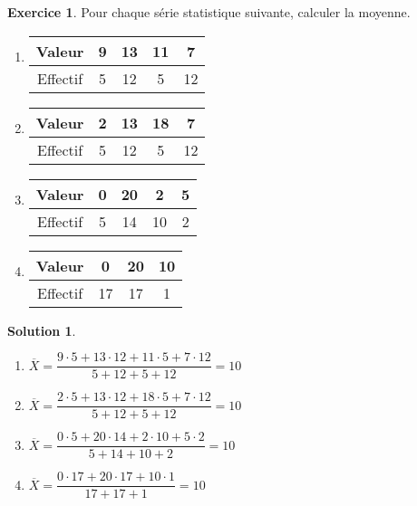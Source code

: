 \documentclass[a4paper, 14pt]{extarticle}
\theoremstyle{plain}
\newtheorem*{sol}{Solution}
\theoremstyle{definition}
\newtheorem{ex}{Exercice}
\newcommand{\exe}[2]{
		\begin{ex} #1  \end{ex}
		\begin{sol} #2 \end{sol}
	}
\newcommand{\exe}[2]{
		\begin{ex} #1  \end{ex}
	}
\begin{document}
\exe{\label{ex:33}
	Pour chaque série statistique suivante, calculer la moyenne.
		\begin{multicols}{2}
		\begin{enumerate}
			\item 
				\begin{tabular}{|c|c|c|c|c|}\hline
				Valeur   & 9 & 13 & 11 & 7 \\ \hline
				Effectif & 5 & 12 & 5 & 12 \\ \hline
				\end{tabular}
				
			\item 
				\begin{tabular}{|c|c|c|c|c|}\hline
				Valeur   & 2 & 13 & 18 & 7 \\ \hline
				Effectif & 5 & 12 & 5 & 12 \\ \hline
				\end{tabular}
				
			\item 
				\begin{tabular}{|c|c|c|c|c|}\hline
				Valeur   & 0 & 20 & 2 & 5 \\ \hline
				Effectif & 5 & 14 & 10 & 2  \\ \hline
				\end{tabular}

			\item 
				\begin{tabular}{|c|c|c|c|}\hline
				Valeur   & 0 & 20 & 10 \\ \hline
				Effectif & 17 & 17 & 1 \\ \hline
				\end{tabular}


		\end{enumerate}
		\end{multicols}
}{
		\begin{enumerate}
			\item 
				$\overline{X} = \dfrac{9\cdot5 + 13\cdot12 + 11\cdot5 + 7\cdot12}{5+12+5+12} = 10$
				
			\item 
				$\overline{X} = \dfrac{2\cdot5 + 13\cdot12 + 18\cdot5 + 7\cdot12}{5+12+5+12} = 10$
				
			\item 
				$\overline{X} = \dfrac{0\cdot5 + 20\cdot14 + 2\cdot10 + 5\cdot2}{5+14+10+2} = 10$

			\item 
				$\overline{X} = \dfrac{0\cdot17 + 20\cdot17 + 10\cdot1}{17+17+1} = 10$

		\end{enumerate}

}
\end{document}
